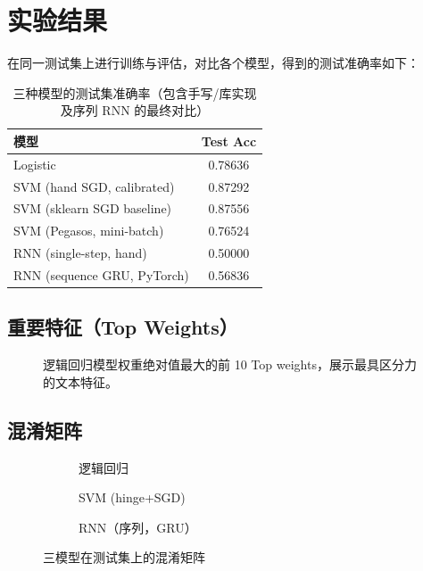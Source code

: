 \section{实验结果}
在同一测试集上进行训练与评估，对比各个模型，得到的测试准确率如下：
\begin{table}[htbp]
\centering
\begin{tabular}{l c}
\hline
模型 & Test Acc \\
\hline
Logistic & 0.78636 \\
SVM (hand SGD, calibrated) & 0.87292 \\
SVM (sklearn SGD baseline) & 0.87556 \\
SVM (Pegasos, mini-batch) & 0.76524 \\
RNN (single-step, hand) & 0.50000 \\
RNN (sequence GRU, PyTorch) & 0.56836 \\
\hline
\end{tabular}
\caption{三种模型的测试集准确率（包含手写/库实现及序列 RNN 的最终对比）}
\end{table}

\subsection{重要特征（Top Weights）}
\begin{figure}[htbp]
    \centering
    \caption{逻辑回归模型权重绝对值最大的前 10 Top weights，展示最具区分力的文本特征。}
\end{figure}

\newpage
\subsection{混淆矩阵}
\begin{figure}[htbp]
    \centering
    \begin{subfigure}[b]{0.32\textwidth}
        \centering
        \caption{逻辑回归}
    \end{subfigure}\hfill
    \begin{subfigure}[b]{0.32\textwidth}
        \centering
        \caption{SVM (hinge+SGD)}
    \end{subfigure}\hfill
    \begin{subfigure}[b]{0.32\textwidth}
        \centering
        \caption{RNN（序列，GRU）}
    \end{subfigure}
    \caption{三模型在测试集上的混淆矩阵}
\end{figure}

